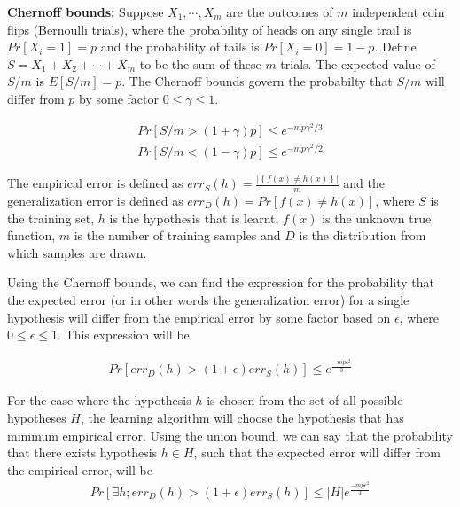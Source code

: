 \begin{enumerate}
{\bf Chernoff bounds:} Suppose $X_1, \cdots, X_m$ are the outcomes of $m$ independent coin flips (Bernoulli trials), where the probability of heads on any single trail is $Pr[X_i = 1] = p$ and the probability of tails is $Pr[X_i = 0] = 1 - p$. Define $S = X_1 + X_2 + \cdots + X_m$ to be the sum of these $m$ trials. The expected value of $S/m$ is $E[S/m] = p$. The Chernoff bounds govern the probabilty that $S/m$ will differ from $p$ by some factor $0 \leq \gamma \leq 1$.

\begin{equation}
    \begin{array}{rcl}
	Pr[S/m > (1 + \gamma) p ] \leq e^{{-mp\gamma^2}/3}\\
	Pr[S/m < (1 - \gamma) p ] \leq e^{{-mp\gamma^2}/2}
	\end{array}
\end{equation}

The empirical error is defined as $err_S(h) = \frac{\left | \left \{ f(x) \neq h(x) \right \} \right |}{m}$ and the generalization error is defined as $err_D(h) =  Pr \left [ f(x) \neq h(x) \right ]$, where $S$ is the training set, $h$ is the hypothesis that is learnt, $f(x)$ is the unknown true function, $m$ is the number of training samples and $D$ is the distribution from which samples are drawn.

Using the Chernoff bounds, we can find the expression for the probability that the expected error (or in other words the generalization error) for a single hypothesis will differ from the empirical error by some factor based on $\epsilon$, where $0 \leq \epsilon \leq 1$. This expression will be

\begin{equation*}
\begin{aligned}
Pr \left[ err_D (h) > (1+\epsilon) err_S(h) \right ] \leq e^{\frac{-mp\epsilon^2}{3}}
\end{aligned}
\end{equation*}

For the case where the hypothesis $h$ is chosen from the set of all possible hypotheses $H$, the learning algorithm will choose the hypothesis that has minimum empirical error. Using the union bound, we can say that the probability that there exists hypothesis $h \in H$, such that the expected error will differ from the empirical error, will be
\begin{equation*}
\begin{aligned}
Pr \left[\exists h; err_D (h) > (1+\epsilon) err_S(h) \right ] \leq \left | H \right | e^{\frac{-mp\epsilon^2}{3}}
\end{aligned}
\end{equation*}


\end{enumerate}
